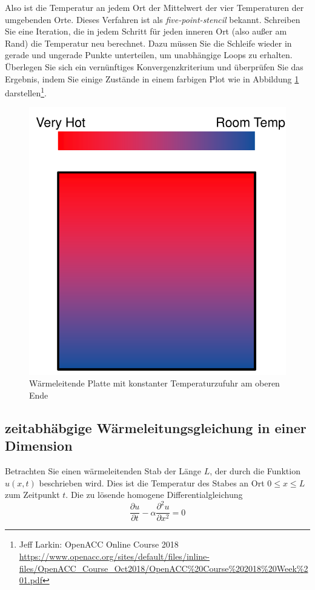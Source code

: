 \documentclass[headsepline=3pt,headinclude=true,12pt,oneside]{scrartcl}
\begin{document}
	Also ist die Temperatur an jedem Ort der Mittelwert der vier Temperaturen der umgebenden Orte. Dieses Verfahren ist als \textit{five-point-stencil} bekannt.
	Schreiben Sie eine Iteration, die in jedem Schritt für jeden inneren Ort (also außer am Rand) die Temperatur neu berechnet. Dazu müssen Sie die Schleife wieder in gerade und ungerade Punkte unterteilen, um unabhängige Loops zu erhalten. Überlegen Sie sich ein vernünftiges Konvergenzkriterium und überprüfen Sie das Ergebnis, indem Sie einige Zustände in einem farbigen Plot wie in Abbildung \ref{platte} darstellen\footnote{Jeff Larkin: OpenACC Online Course 2018\\ \url{https://www.openacc.org/sites/default/files/inline-files/OpenACC_Course_Oct2018/OpenACC\%20Course\%202018\%20Week\%201.pdf}}.
	\begin{figure}[h]
		\centering
		\includegraphics[scale=0.5]{platte.png}
		\caption{Wärmeleitende Platte mit konstanter Temperaturzufuhr am oberen Ende}
		\label{platte}		
	\end{figure}
	
	\subsection{zeitabhäbgige Wärmeleitungsgleichung in einer Dimension}
	Betrachten Sie einen wärmeleitenden Stab der Länge $L$, der durch die Funktion $u(x,t)$ beschrieben wird. Dies ist die Temperatur des Stabes an Ort $0\leq x \leq L$ zum Zeitpunkt $t$. Die zu lösende homogene Differentialgleichung
	\begin{equation}\label{diff}
		\frac{\partial u}{\partial t} - \alpha\frac{\partial^2 u}{\partial x^2} = 0
	\end{equation}
	
\end{document}
